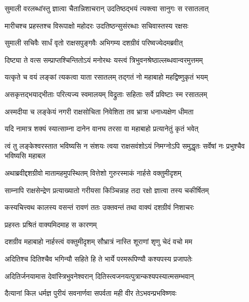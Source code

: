 
\twolineshloka
{सुमाली वरलब्धांस्तु ज्ञात्वा चैतान्निशाचरान्}
{उदतिष्ठद्भयं त्यक्त्वा सानुगः स रसातलात्} %

\twolineshloka
{मारीचश्च प्रहस्तश्च विरूपाक्षो महोदरः}
{उदतिष्ठन्सुसंरब्धाः सचिवास्तस्य रक्षसः} %

\twolineshloka
{सुमाली सचिवैः सार्धं वृतो राक्षसपुङ्गवैः}
{अभिगम्य दशग्रीवं परिष्वज्येदमब्रवीत्} %

\twolineshloka
{दिष्ट्या ते वत्स सम्प्राप्तश्चिन्तितोऽयं मनोरथः}
{यस्त्वं त्रिभुवनश्रेष्ठाल्लब्धवान्वरमुत्तमम्} %

\twolineshloka
{यत्कृते च वयं लङ्कां त्यकत्वा याता रसातलम्}
{तद्गतं नो महाबाहो महद्विष्णुकृतं भयम्} %

\twolineshloka
{असकृत्तद्भयाद्भीताः परित्यज्य स्वमालयम्}
{विद्रुताः सहिताः सर्वे प्रविष्टाः स्म रसातलम्} %

\twolineshloka
{अस्मदीया च लङ्केयं नगरी राक्षसोचिता}
{निवेशिता तव भ्रात्रा धनाध्यक्षेण धीमता} %

\twolineshloka
{यदि नामात्र शक्यं स्यात्साम्ना दानेन वानघ}
{तरसा वा महाबाहो प्रत्यानेतुं कृतं भवेत्} %

\threelineshloka
{त्वं तु लङ्केश्वरस्तात भविष्यसि न संशयः}
{त्वया राक्षसवंशोऽयं निमग्नोऽपि समुद्धृतः}
{सर्वेषां नः प्रभुश्चैव भविष्यसि महाबल} %

\twolineshloka
{अथाब्रवीद्दशग्रीवो मातामहमुपस्थितम्}
{वित्तेशो गुरुरस्माकं नार्हसे वक्तुमीदृशम्} %

\twolineshloka
{साम्नापि राक्षसेन्द्रेण प्रत्याख्यातो गरीयसा}
{किञ्चिन्नाह तदा रक्षो ज्ञात्वा तस्य चकीर्षितम्} %

\twolineshloka
{कस्यचित्त्वथ कालस्य वसन्तं रावणं ततः}
{उक्तवन्तं तथा वाक्यं दशग्रीवं निशाचरः} %

\onelineshloka
{प्रहस्तः प्रश्रितं वाक्यमिदमाह स कारणम्} %

\twolineshloka
{दशग्रीव महाबाहो नार्हस्त्वं वक्तुमीदृशम्}
{सौभ्रात्रं नास्ति शूराणां शृणु चेदं वचो मम} %

\twolineshloka
{अदितिश्च दितिश्चैव भगिन्यौ सहिते हि ते}
{भार्ये परमरूपिण्यौ कश्यपस्य प्रजापतेः} %

\twolineshloka
{अदितिर्जनयामास देवांस्त्रिभुवनेश्वरान्}
{दितिस्त्वजनयत्पुत्रान्कश्यपस्यात्मसम्भवान्} %

\twolineshloka
{दैत्यानां किल धर्मज्ञ पुरीयं सवनार्णवा}
{सपर्वता मही वीर तेऽभवन्प्रभविष्णवः} %

